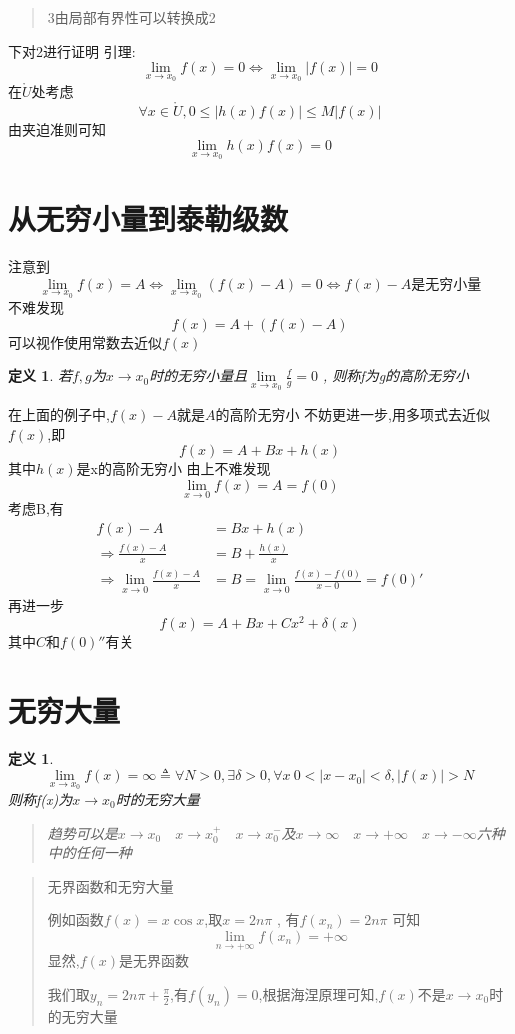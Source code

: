\documentclass[UTF8,11pt]{ctexart}
\theoremstyle{cnthm}
\newtheorem{defn}[thm]{定义}
\begin{document}
\begin{quote}
3由局部有界性可以转换成2
\end{quote}

下对2进行证明
引理:
\[
\lim_{x \to x_0}f(x) = 0 \Leftrightarrow \lim_{x \to x_0}|f(x)| = 0
\]
在$\mathring{U}$处考虑
\[
\forall x \in \mathring{U} , 0 \leq |h(x)f(x)| \leq M|f(x)|
\]
由夹迫准则可知
\[
\lim_{x \to x_0} h(x)f(x) = 0
\]

\section{从无穷小量到泰勒级数}

注意到
\[
\lim_{x \to x_0}f(x) = A
\Leftrightarrow \lim_{x \to x_0}(f(x)-A) = 0
\Leftrightarrow f(x)-A \text{是无穷小量}
\]
不难发现
\[
f(x) = A + (f(x)-A)
\]
可以视作使用常数去近似$f(x)$

\begin{defn}
若$f,g$为$x \to x_0$时的无穷小量且$\lim\limits_{x \to x_0} \frac{f}{g} = 0$ , 则称f为g的高阶无穷小
\end{defn}

在上面的例子中,$f(x)-A$就是$A$的高阶无穷小
不妨更进一步,用多项式去近似$f(x)$,即
\[
f(x) = A + Bx + h(x)
\]
其中$h(x)$是x的高阶无穷小
由上不难发现
\[
\lim_{x \to 0}f(x) = A = f(0)
\]
考虑B,有
\[
\begin{aligned}
f(x) - A &= Bx +h(x) \\
\Rightarrow \frac{f(x)-A}{x} &= B + \frac{h(x)}{x} \\
\Rightarrow \lim_{x \to 0} \frac{f(x)-A}{x} &= B = \lim_{x \to 0} \frac{f(x)-f(0)}{x-0} = f(0)'
\end{aligned}
\]
再进一步
\[
f(x) = A +Bx +Cx^2 + \delta(x)
\]
其中$C$和$f(0)''$有关

\section{无穷大量}

\begin{defn}
\[
\lim_{x \to x_0} f(x) = \infty \triangleq \forall N >0 , \exists \delta >0 , \forall x \ 0<|x-x_0|<\delta , |f(x)| > N
\]
则称f(x)为$x \to x_0$时的无穷大量
\begin{quote}
趋势可以是$x \to x_0 \quad x \to x_0^+ \quad x \to x_0^-$及$x \to \infty \quad x \to +\infty \quad x \to -\infty$六种中的任何一种
\end{quote}
\end{defn}

\begin{quote}
无界函数和无穷大量

例如函数$f(x) = x \cos{x}$,取$x = 2n\pi$ , 有$f(x_n) = 2n \pi$ 可知
\[
\lim_{n \to +\infty}f(x_n) = +\infty
\]
显然,$f(x)$是无界函数

我们取$y_n = 2n\pi + \frac{\pi}{2}$,有$f(y_n) = 0$,根据海涅原理可知,$f(x)$不是$x \to x_0$时的无穷大量
\end{quote}
\end{document}
